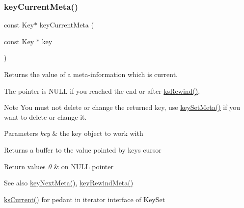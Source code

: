\subsubsection{\texorpdfstring{keyCurrentMeta()}{keyCurrentMeta()}}
{\footnotesize\ttfamily const Key$\ast$ key\+Current\+Meta (\begin{DoxyParamCaption}\item[{const Key $\ast$}]{key }\end{DoxyParamCaption})}



Returns the value of a meta-\/information which is current. 

The pointer is N\+U\+LL if you reached the end or after \mbox{\hyperlink{group__keyset_gabe793ff51f1728e3429c84a8a9086b70}{ks\+Rewind()}}.

\begin{DoxyNote}{Note}
You must not delete or change the returned key, use \mbox{\hyperlink{group__keymeta_gae1f15546b234ffb6007d8a31178652b9}{key\+Set\+Meta()}} if you want to delete or change it.
\end{DoxyNote}

\begin{DoxyParams}{Parameters}
{\em key} & the key object to work with \\
\hline
\end{DoxyParams}
\begin{DoxyReturn}{Returns}
a buffer to the value pointed by {\ttfamily key\textquotesingle{}s} cursor 
\end{DoxyReturn}

\begin{DoxyRetVals}{Return values}
{\em 0} & on N\+U\+LL pointer \\
\hline
\end{DoxyRetVals}
\begin{DoxySeeAlso}{See also}
\mbox{\hyperlink{group__keymeta_ga4c88342f580a4291455a801af71ce048}{key\+Next\+Meta()}}, \mbox{\hyperlink{group__keymeta_ga5dbb669802eea27e106ee3a5e39717a9}{key\+Rewind\+Meta()}}

\mbox{\hyperlink{group__keyset_ga4287b9416912c5f2ab9c195cb74fb094}{ks\+Current()}} for pedant in iterator interface of Key\+Set 
\end{DoxySeeAlso}
\mbox{\label{group__keymeta_ga9ed3875495ddb3d8a8d29158a60a147c}} 
